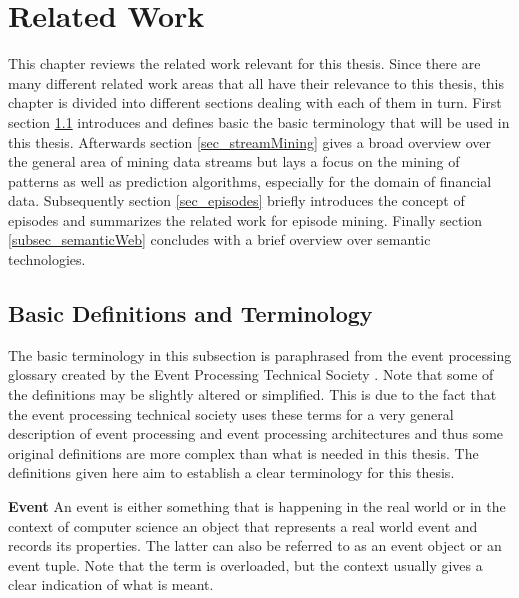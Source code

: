 
\chapter{Related Work}
\label{chapter_related}

\ifpdf
    \graphicspath{{Chapter2/Figs/Raster/}{Chapter2/Figs/PDF/}{Chapter2/Figs/}}
\else
    \graphicspath{{Chapter2/Figs/Vector/}{Chapter2/Figs/}}
\fi

This chapter reviews the related work relevant for this thesis. Since there are many different related work areas that all have their relevance to this thesis, this chapter is divided into different sections dealing with each of them in turn. First section \ref{sec_basicDefinitions} introduces and defines basic the basic terminology that will be used in this thesis. Afterwards section \ref{sec_streamMining} gives a broad overview over the general area of mining data streams but lays a focus on the mining of patterns as well as prediction algorithms, especially for the domain of financial data. Subsequently section \ref{sec_episodes} briefly introduces the concept of episodes and summarizes the related work for episode mining. Finally section \ref{subsec_semanticWeb} concludes with a brief overview over semantic technologies.


\section{Basic Definitions and Terminology}
\label{sec_basicDefinitions}
The basic terminology in this subsection is paraphrased from the event processing glossary created by the Event Processing Technical Society \cite{luckham2011epts}. Note that some of the definitions may be slightly altered or simplified. This is due to the fact that the event processing technical society uses these terms for a very general description of event processing and event processing architectures and thus some original definitions are more complex than what is needed in this thesis. The definitions given here aim to establish a clear terminology for this thesis.

\begin{mydef}
\textbf{Event} An event is either something that is happening in the real world or in the context of computer science an object that represents a real world event and records its properties. The latter can also be referred to as an event object or an event tuple. Note that the term is overloaded, but the context usually gives a clear indication of what is meant.
\end{mydef}

